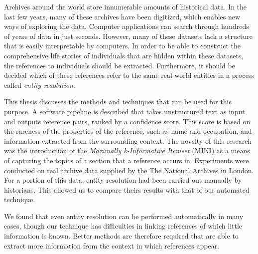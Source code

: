 Archives around the world store innumerable amounts of historical data.
In the last few years, many of these archives have been digitized, which enables new ways of exploring the data.
Computer applications can search through hundreds of years of data in just seconds.
However, many of these datasets lack a structure that is easily interpretable by computers.
In order to be able to construct the comprehensive life stories of individuals that are hidden within these datasets, the references to individuals should be extracted.
Furthermore, it should be decided which of these references refer to the same real-world entities in a process called \emph{entity resolution}.

This thesis discusses the methods and techniques that can be used for this purpose.
A software pipeline is described that takes unstructured text as input and outputs reference pairs, ranked by a confidence score.
This score is based on the rareness of the properties of the reference, such as name and occupation, and information extracted from the surrounding context.
The novelty of this research was the introduction of the \emph{Maximally k-Informative Itemset} (MIKI) as a means of capturing the topics of a section that a reference occurs in.
Experiments were conducted on real archive data supplied by the The National Archives in London.
For a portion of this data, entity resolution had been carried out manually by historians.
This allowed us to compare theirs results with that of our automated technique.

We found that even entity resolution can be performed automatically in many cases, though our technique has difficulties in linking references of which little information is known.
Better methods are therefore required that are able to extract more information from the context in which references appear.